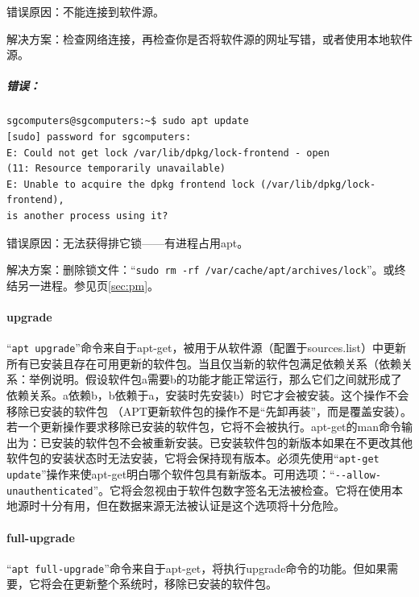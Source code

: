 错误原因：不能连接到软件源。 \par
解决方案：检查网络连接，再检查你是否将软件源的网址写错，或者使用本地软件源。 \par
\subparagraph{错误：}
\begin{verbatim}
sgcomputers@sgcomputers:~$ sudo apt update
[sudo] password for sgcomputers:
E: Could not get lock /var/lib/dpkg/lock-frontend - open 
(11: Resource temporarily unavailable)
E: Unable to acquire the dpkg frontend lock (/var/lib/dpkg/lock-frontend), 
is another process using it?
\end{verbatim} \par
错误原因：无法获得排它锁——有进程占用apt。\par
解决方案：删除锁文件：“\verb|sudo rm -rf /var/cache/apt/archives/lock|”。或终结另一进程。参见\pageref{sec:pm}页\ref{sec:pm}。
\paragraph{upgrade}
“\verb|apt upgrade|”命令来自于apt-get，被用于从软件源（配置于sources.list）中更新所有已安装且存在可用更新的软件包。当且仅当新的软件包满足依赖关系（依赖关系：举例说明。假设软件包a需要b的功能才能正常运行，那么它们之间就形成了依赖关系。a依赖b，b依赖于a，安装时先安装b）时它才会被安装。这个操作不会移除已安装的软件包 （APT更新软件包的操作不是“先卸再装”，而是覆盖安装）。若一个更新操作要求移除已安装的软件包，它将不会被执行。apt-get的man命令输出为：已安装的软件包不会被重新安装。已安装软件包的新版本如果在不更改其他软件包的安装状态时无法安装，它将会保持现有版本。必须先使用“\verb|apt-get update|”操作来使apt-get明白哪个软件包具有新版本。可用选项：“\verb|--allow-unauthenticated|”。它将会忽视由于软件包数字签名无法被检查。它将在使用本地源时十分有用，但在数据来源无法被认证是这个选项将十分危险。
\paragraph{full-upgrade}
“\verb|apt full-upgrade|”命令来自于apt-get，将执行upgrade命令的功能。但如果需要，它将会在更新整个系统时，移除已安装的软件包。 \par
